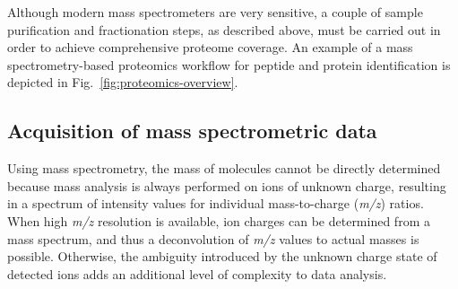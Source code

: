 Although modern mass spectrometers are very sensitive, a couple of sample 
purification and fractionation steps, as described above, must be carried out 
in order to achieve comprehensive proteome coverage. 
An example of a mass spectrometry-based proteomics workflow for peptide 
and protein identification is depicted in Fig.~\ref{fig:proteomics-overview}.



\subsection{Acquisition of mass spectrometric data}

Using mass spectrometry, the mass of molecules cannot be directly determined
because mass analysis is always performed on ions of unknown charge, resulting
in a spectrum of intensity values for individual mass-to-charge ({\em m/z}) 
ratios.
When high {\em m/z} resolution is available, ion charges can be determined 
from a mass spectrum, and thus a deconvolution of {\em m/z} values to actual 
masses is possible.
Otherwise, the ambiguity introduced by the unknown charge state of detected
ions adds an additional level of complexity to data analysis.



